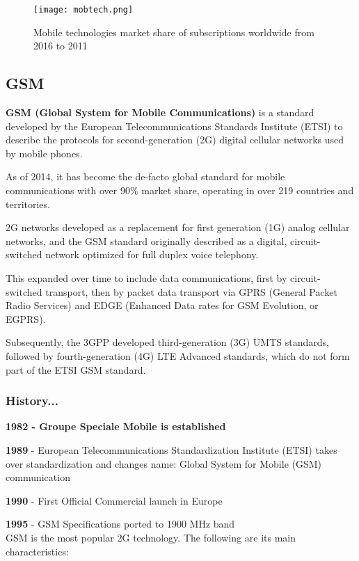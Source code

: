 \begin{figure}[H]
  \centering
  \texttt{[image: mobtech.png]}
  \caption{Mobile technologies market share of subscriptions worldwide from
  2016 to 2011}
  \label{fig:mobtech}
\end{figure}

\subsection{GSM}

\textbf{GSM (Global System for Mobile Communications)} is a standard
developed by the European Telecommunications Standards Institute (ETSI) to
describe the protocols for second-generation (2G) digital cellular networks
used by mobile phones.

As of 2014, it has become the de-facto global standard for mobile
communications with over 90\% market share, operating in over 219 countries
and territories.

2G networks developed as a replacement for first generation (1G) analog
cellular networks, and the GSM standard originally described as a digital,
circuit-switched network optimized for full duplex voice telephony.

This expanded over time to include data communications, first by
circuit-switched transport, then by packet data transport via GPRS
(General Packet Radio Services) and EDGE (Enhanced Data rates for GSM
Evolution, or EGPRS).

Subsequently, the 3GPP developed third-generation (3G) UMTS standards, followed
by fourth-generation (4G) LTE Advanced standards, which do not form part of the
ETSI GSM standard.

\subsubsection{History...}

\textbf{1982 - Groupe Speciale Mobile is established}

\textbf{1989} - European Telecommunications Standardization Institute
(ETSI) takes over standardization and changes name: Global System for Mobile
(GSM) communication

\textbf{1990} - First Official Commercial launch in Europe

\textbf{1995} - GSM Specifications ported to 1900 MHz band \\

GSM is the most popular 2G technology. The following are its main
characteristics:

